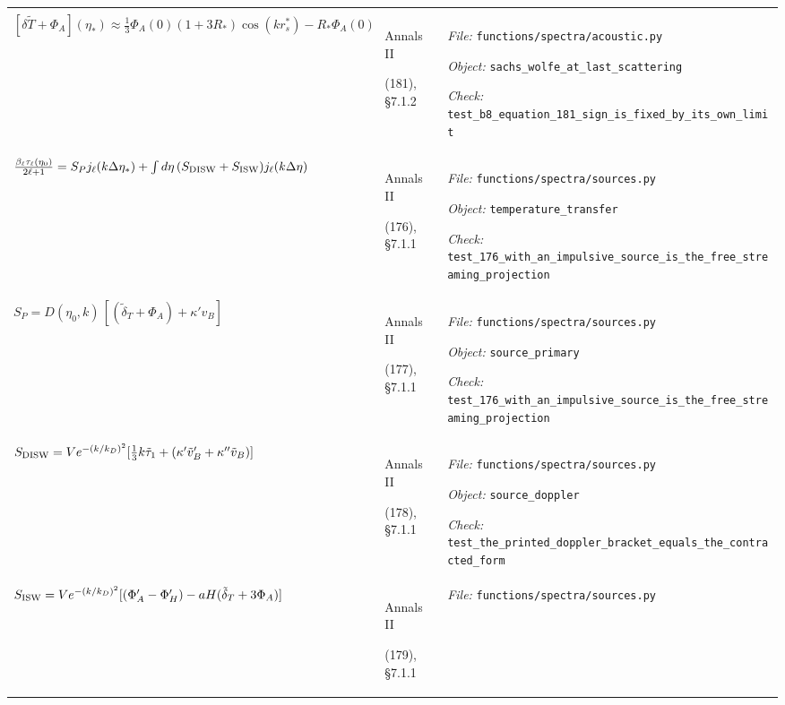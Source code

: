 \begin{landscape}
\begin{longtable}{@{}>{\raggedright\arraybackslash}p{80mm}
                     >{\raggedright\arraybackslash}p{38mm}
                     >{\raggedright\arraybackslash}p{99mm}@{}}
{\textit{Object:} \nolinkurl{sachs_wolfe_at_last_scattering}\par
\textit{Check:} \nolinkurl{test_the_integration_converges_to_the_closed_form_180_as_r_is_held_constant}} \\
\addlinespace[2pt]
$[\delta\tilde T+\Phi_A](\eta_*) \approx \tfrac13\Phi_A(0)(1+3R_*)\cos(kr_s^*) - R_*\Phi_A(0)$ & Annals II\par (181), \S7.1.2 & {\scriptsize \textit{File:} \nolinkurl{functions/spectra/acoustic.py}\par
\textit{Object:} \nolinkurl{sachs_wolfe_at_last_scattering}\par
\textit{Check:} \nolinkurl{test_b8_equation_181_sign_is_fixed_by_its_own_limit}} \\
\addlinespace[2pt]
$\frac{\beta_\ell\tau_\ell(\eta_0)}{2\ell+1} = S_P j_\ell(k\Delta\eta_*) + \int d\eta\,(S_{\rm DISW}+S_{\rm ISW})j_\ell(k\Delta\eta)$ & Annals II\par (176), \S7.1.1 & {\scriptsize \textit{File:} \nolinkurl{functions/spectra/sources.py}\par
\textit{Object:} \nolinkurl{temperature_transfer}\par
\textit{Check:} \nolinkurl{test_176_with_an_impulsive_source_is_the_free_streaming_projection}} \\
\addlinespace[2pt]
$S_P = D(\eta_0,k)\,[(\tilde\delta_T+\Phi_A)+\kappa' v_B]$ & Annals II\par (177), \S7.1.1 & {\scriptsize \textit{File:} \nolinkurl{functions/spectra/sources.py}\par
\textit{Object:} \nolinkurl{source_primary}\par
\textit{Check:} \nolinkurl{test_176_with_an_impulsive_source_is_the_free_streaming_projection}} \\
\addlinespace[2pt]
$S_{\rm DISW} = Ve^{-(k/k_D)^2}[\tfrac{1}{3}k\tilde\tau_1+(\kappa'\tilde v_B'+\kappa''\tilde v_B)]$ & Annals II\par (178), \S7.1.1 & {\scriptsize \textit{File:} \nolinkurl{functions/spectra/sources.py}\par
\textit{Object:} \nolinkurl{source_doppler}\par
\textit{Check:} \nolinkurl{test_the_printed_doppler_bracket_equals_the_contracted_form}} \\
\addlinespace[2pt]
$S_{\rm ISW} = Ve^{-(k/k_D)^2}[(\Phi_A'-\Phi_H') - aH(\tilde\delta_T+3\Phi_A)]$ & Annals II\par (179), \S7.1.1 & {\scriptsize \textit{File:} \nolinkurl{functions/spectra/sources.py}\par
}
\end{longtable}
\end{landscape}
